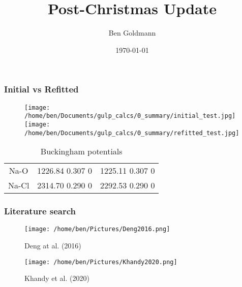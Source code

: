 \documentclass{beamer}
\title{Post-Christmas Update}
\author{Ben Goldmann}
\date{\today}
\begin{document}
\begin{frame}
\titlepage
\end{frame}

\begin{frame}
\frametitle{Initial vs Refitted}

\begin{figure}
\texttt{[image: /home/ben/Documents/gulp\_calcs/0\_summary/initial\_test.jpg]}%
\texttt{[image: /home/ben/Documents/gulp\_calcs/0\_summary/refitted\_test.jpg]}
\end{figure}

\begin{table}[h!]
  \begin{center}
    \caption{Buckingham potentials}
    \begin{tabular}{c|c|c}
      \hline
      Na-O & 1226.84 0.307 0 & 1225.11 0.307 0 \\
      Na-Cl & 2314.70 0.290 0 & 2292.53 0.290 0 \\
    \end{tabular}
  \end{center}
\end{table}

\end{frame}

\begin{frame}
\frametitle{Literature search}

\begin{figure}[ht]
  \begin{minipage}{0.45\linewidth}
    \centering
      \texttt{[image: /home/ben/Pictures/Deng2016.png]}
      \caption{Deng at al. (2016)}
  \end{minipage}
  \hspace{0.5cm}
  \begin{minipage}{0.45\linewidth}
    \centering
    \texttt{[image: /home/ben/Pictures/Khandy2020.png]}
    \caption{Khandy et al. (2020)}
  \end{minipage}
\end{figure}

\end{frame}
\end{document}
